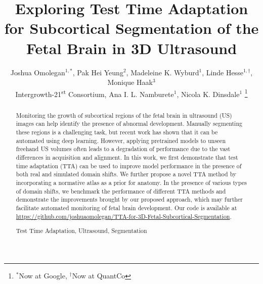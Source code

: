 \documentclass[conference]{IEEEtran}
\title{Exploring Test Time Adaptation for Subcortical Segmentation of the Fetal Brain in 3D Ultrasound}
\begin{document}

%
%

\author{Joshua Omolegan$^{1, *}$, Pak Hei Yeung$^{2}$, Madeleine K. Wyburd$^{1}$, Linde Hesse$^{1, \dag}$, Monique Haak$^{3}$ \\
Intergrowth-21\textsuperscript{st} Consortium, Ana I. L. Namburete$^{1}$, Nicola K. Dinsdale$^{1}$
\thanks{$^{*}$Now at Google, $^{\dag}$Now at QuantCo}}





%

\maketitle        %

\begin{abstract}
Monitoring the growth of subcortical regions of the fetal brain in ultrasound (US) images can help identify the presence of abnormal development. Manually segmenting these regions is a challenging task, but recent work has shown that it can be automated using deep learning. However, applying pretrained models to unseen freehand US volumes often leads to a degradation of performance due to the vast differences in acquisition and alignment. In this work, we first demonstrate that test time adaptation (TTA) can be used to improve model performance in the presence of both real and simulated domain shifts. We further propose a novel TTA method by incorporating a normative atlas as a prior for anatomy. 
In the presence of various types of domain shifts,
we benchmark the performance of different TTA methods and demonstrate the improvements brought by our proposed approach,
which may further facilitate automated monitoring of fetal brain development. 
Our code is available at \url{https://github.com/joshuaomolegan/TTA-for-3D-Fetal-Subcortical-Segmentation}.

\begin{IEEEkeywords}
Test Time Adaptation, Ultrasound, Segmentation
\end{IEEEkeywords}
\end{abstract}
\vspace*{-5pt}
\end{document}
